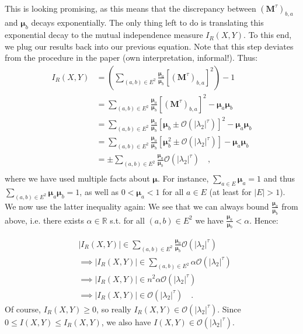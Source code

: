 \documentclass[../../main.tex]{subfiles}
\begin{document}
    ~\\
    This is looking promising, as this means that the discrepancy between $(\boldsymbol{M}^\tau)_{b,a}$ and $\boldsymbol{\mu}_b$ decays exponentially. The only thing left to do is translating this exponential decay to the mutual independence measure $I_R(X, Y)$. To this end, we plug our results back into our previous equation. Note that this step deviates from the procedure in the paper (own interpretation, informal!). Thus:
    \begin{align*}
        I_R(X, Y) &= \left( \sum_{(a,b) \in E^2} \frac{\boldsymbol{\mu}_a}{\boldsymbol{\mu}_b} \left[ (\boldsymbol{M}^{\tau})_{b,a} \right] ^2 \right) - 1 \\
        &= \sum_{(a,b) \in E^2} \frac{\boldsymbol{\mu}_a}{\boldsymbol{\mu}_b} \left[ (\boldsymbol{M}^{\tau})_{b,a} \right] ^2 - \boldsymbol{\mu}_a \boldsymbol{\mu}_b \\
        &= \sum_{(a,b) \in E^2} \frac{\boldsymbol{\mu}_a}{\boldsymbol{\mu}_b} \left[ \boldsymbol{\mu}_b \pm \mathcal{O}(|\lambda_2|^\tau) \right] ^2 - \boldsymbol{\mu}_a \boldsymbol{\mu}_b \\
        &= \sum_{(a,b) \in E^2} \frac{\boldsymbol{\mu}_a}{\boldsymbol{\mu}_b} \left[ \boldsymbol{\mu}_b^2 \pm \mathcal{O}(|\lambda_2|^\tau) \right] - \boldsymbol{\mu}_a \boldsymbol{\mu}_b \\
        &= \pm \sum_{(a,b) \in E^2} \frac{\boldsymbol{\mu}_a}{\boldsymbol{\mu}_b} \mathcal{O}(|\lambda_2|^\tau) \quad , \\
    \end{align*}
    where we have used multiple facts about $\boldsymbol{\mu}$. For instance, $\sum_{a \in E} \boldsymbol{\mu}_a = 1$ and thus $\sum_{(a,b) \in E^2} \boldsymbol{\mu}_a \boldsymbol{\mu}_b = 1$, as well as $0 < \boldsymbol{\mu}_a < 1$ for all $a \in E$ (at least for $|E| > 1$). We now use the latter inequality again: We see that we can always bound $\frac{\boldsymbol{\mu}_a}{\boldsymbol{\mu}_b}$ from above, i.e. there exists $\alpha \in \mathbb{R}$ s.t. for all $(a,b) \in E^2$ we have $\frac{\boldsymbol{\mu}_a}{\boldsymbol{\mu}_b} < \alpha$. Hence:

    \begin{align*}
        &|I_R(X, Y)| \in \sum_{(a,b) \in E^2} \frac{\boldsymbol{\mu}_a}{\boldsymbol{\mu}_b} \mathcal{O}(|\lambda_2|^\tau) \\
        &\implies |I_R(X, Y)| \in \sum_{(a,b) \in E^2} \alpha \mathcal{O}(|\lambda_2|^\tau) \\
        &\implies |I_R(X, Y)| \in n^2 \alpha \mathcal{O}(|\lambda_2|^\tau) \\
        &\implies |I_R(X, Y)| \in \mathcal{O}(|\lambda_2|^\tau) \quad .
    \end{align*}
    Of course, $I_R(X, Y) \geq 0$, so really $I_R(X, Y) \in \mathcal{O}(|\lambda_2|^\tau)$. Since $0 \leq I(X, Y) \leq I_R(X, Y)$, we also have $I(X, Y) \in \mathcal{O}(|\lambda_2|^\tau)$.
\end{document}
